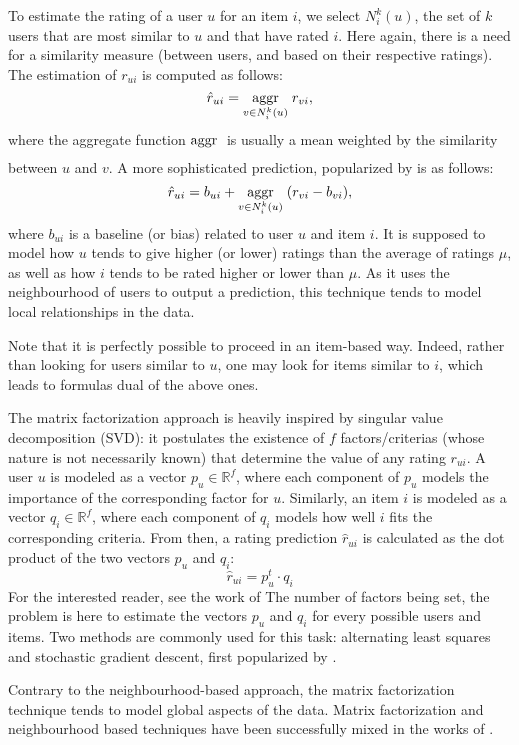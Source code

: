 To estimate the rating of a user $u$ for an item $i$, we
select $N_i^k(u)$, the set of $k$ users that are most similar to $u$ and that
have rated $i$. Here again, there is a need for a similarity measure (between
users, and based on their respective ratings). The estimation of $r_{ui}$ is computed as follows:
$$\hat{r}_{ui} = \underset{v \in N_i^k(u)}{\operatorname{aggr}}\;r_{vi},$$
where the aggregate function $\underset{}{\operatorname{aggr}}\;$ is usually a mean weighted by the similarity between $u$
and $v$. A more sophisticated prediction, popularized by
\cite{BelKorSIGKDD2007} is as follows:
$$\hat{r}_{ui} = b_{ui} + \underset{v \in N_i^k(u)}{\operatorname{aggr}}\;(r_{vi} - b_{vi}),$$
where $b_{ui}$ is a baseline (or bias) related to user $u$ and item $i$. It
is supposed to model how $u$ tends to give higher (or lower) ratings than the
average of ratings $\mu$, as well as how $i$ tends to be rated higher or lower
than $\mu$. As it uses the neighbourhood of users to output a prediction, this
technique tends to model local relationships in the data.

Note that it is perfectly possible to proceed in an item-based way. Indeed,
rather than looking for users similar to $u$, one may look for items similar to
$i$, which leads to formulas dual of the above ones. 

The matrix factorization approach is heavily inspired by singular value
decomposition (SVD): it postulates the existence of $f$ factors/criterias
(whose nature is not necessarily known) that determine the value of any rating
$r_{ui}$.  A user $u$ is modeled as a vector $p_u \in \mathbb{R}^f$, where each
component of $p_u$ models the importance of the corresponding factor for $u$.
Similarly, an item $i$ is modeled as a vector $q_i \in \mathbb{R}^f$, where
each component of $q_i$ models how well $i$ fits the corresponding criteria.
From then, a rating prediction $\hat{r}_{ui}$ is calculated as the dot product
of the two vectors $p_u$ and $q_i$: $$\hat{r}_{ui} = p_u^t \cdot q_i$$ For the
interested reader, see the work of
\cite{Funk2006,KorACM2010} The number of factors being set,
the problem is here to estimate the vectors $p_u$ and $q_i$ for every possible
users and items. Two methods are commonly used for this task: alternating least
squares and stochastic gradient descent, first popularized by \cite{Funk2006}.

Contrary to the neighbourhood-based approach, the matrix factorization
technique tends to model global aspects of the data.  Matrix factorization and
neighbourhood based techniques have been successfully mixed in the works of
\cite{KorACM2010}.  


